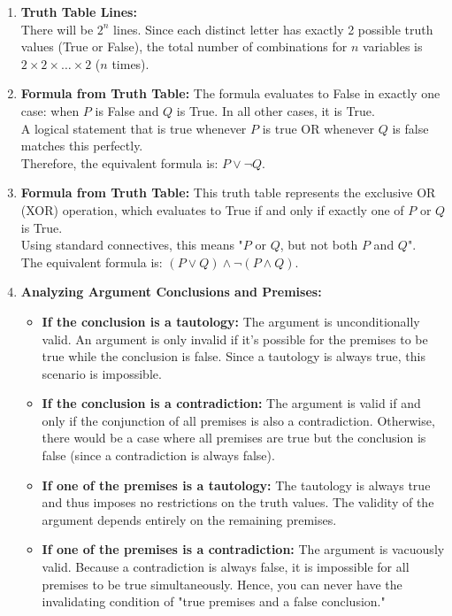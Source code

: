 \begin{enumerate}
  \item \textbf{Truth Table Lines:} \\
  There will be $2^n$ lines. Since each distinct letter has exactly 2 possible truth values (True or False), the total number of combinations for $n$ variables is $2 \times 2 \times \dots \times 2$ ($n$ times).

  \item \textbf{Formula from Truth Table:}
  The formula evaluates to False in exactly one case: when $P$ is False and $Q$ is True. In all other cases, it is True. \\
  A logical statement that is true whenever $P$ is true OR whenever $Q$ is false matches this perfectly. \\
  Therefore, the equivalent formula is: $P \lor \neg Q$.

  \item \textbf{Formula from Truth Table:}
  This truth table represents the exclusive OR (XOR) operation, which evaluates to True if and only if exactly one of $P$ or $Q$ is True. \\
  Using standard connectives, this means "$P$ or $Q$, but not both $P$ and $Q$". \\
  The equivalent formula is: $(P \lor Q) \land \neg(P \land Q)$.

  \item \textbf{Analyzing Argument Conclusions and Premises:} \\
  \begin{itemize}
    \item \textbf{If the conclusion is a tautology:} The argument is unconditionally valid. An argument is only invalid if it's possible for the premises to be true while the conclusion is false. Since a tautology is always true, this scenario is impossible.
    \item \textbf{If the conclusion is a contradiction:} The argument is valid if and only if the conjunction of all premises is also a contradiction. Otherwise, there would be a case where all premises are true but the conclusion is false (since a contradiction is always false).
    \item \textbf{If one of the premises is a tautology:} The tautology is always true and thus imposes no restrictions on the truth values. The validity of the argument depends entirely on the remaining premises.
    \item \textbf{If one of the premises is a contradiction:} The argument is vacuously valid. Because a contradiction is always false, it is impossible for all premises to be true simultaneously. Hence, you can never have the invalidating condition of "true premises and a false conclusion."
  \end{itemize}
\end{enumerate}
